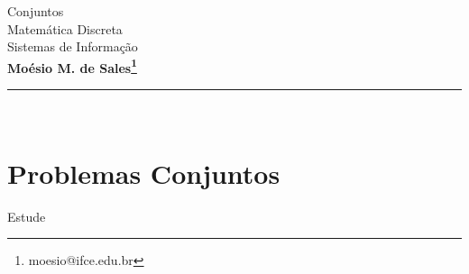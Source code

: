 \documentclass[11pt,a4paper]{article}
\makeatletter
\newcommand{\nome}{\bf Moésio M. de Sales\footnote{moesio@ifce.edu.br}}
\newcommand{\titu}{Conjuntos}
\newcommand{\disc}{Matemática Discreta}
\newcommand{\curso}{Sistemas de Informação}
\makeatother
\begin{document}
{\Large
\begin{center} \titu\\ \disc\\ \curso \\  \nome\end{center}
}
\hfill   %
\hrule\ 
\section{\sc Problemas Conjuntos}

Estude\cite{gersting2004fundamentos,Ed1976teoria,scheinerman2003mat}

\bexer















\eexerc

\printbibliography
\end{document}
